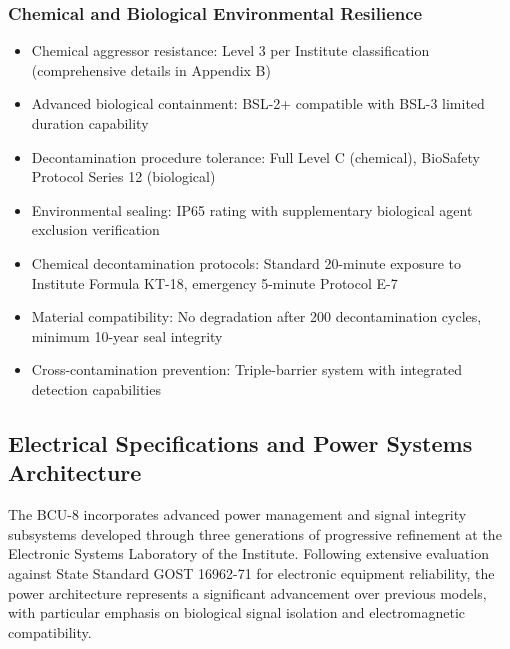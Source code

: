\documentclass[12pt]{article}
\begin{document}
\subsubsection{Chemical and Biological Environmental Resilience}
\begin{itemize}
    \item Chemical aggressor resistance: Level 3 per Institute classification (comprehensive details in Appendix B)
    \item Advanced biological containment: BSL-2+ compatible with BSL-3 limited duration capability
    \item Decontamination procedure tolerance: Full Level C (chemical), BioSafety Protocol Series 12 (biological)
    \item Environmental sealing: IP65 rating with supplementary biological agent exclusion verification
    \item Chemical decontamination protocols: Standard 20-minute exposure to Institute Formula KT-18, emergency 5-minute Protocol E-7
    \item Material compatibility: No degradation after 200 decontamination cycles, minimum 10-year seal integrity
    \item Cross-contamination prevention: Triple-barrier system with integrated detection capabilities
\end{itemize}

\subsection{Electrical Specifications and Power Systems Architecture}
The BCU-8 incorporates advanced power management and signal integrity subsystems developed through three generations of progressive refinement at the Electronic Systems Laboratory of the Institute. Following extensive evaluation against State Standard GOST 16962-71 for electronic equipment reliability, the power architecture represents a significant advancement over previous models, with particular emphasis on biological signal isolation and electromagnetic compatibility.
\end{document}
